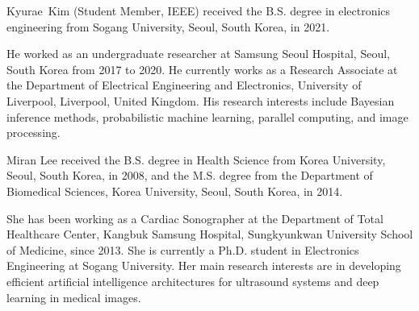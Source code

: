 
\begin{IEEEbiography}{Kyurae~Kim} (Student Member, IEEE) received the B.S. degree in electronics engineering from Sogang University, Seoul, South Korea, in 2021.

  He worked as an undergraduate researcher at Samsung Seoul Hospital, Seoul, South Korea from 2017 to 2020.
  He currently works as a Research Associate at the Department of Electrical Engineering and Electronics, University of Liverpool, Liverpool, United Kingdom.
  His research interests include Bayesian inference methods, probabilistic machine learning, parallel computing, and image processing.
\end{IEEEbiography}

\begin{IEEEbiography}{Miran Lee} received the B.S. degree in Health Science from Korea University, Seoul, South Korea, in 2008, and the M.S. degree from the Department of Biomedical Sciences, Korea University, Seoul, South Korea, in 2014.

  She has been working as a Cardiac Sonographer at the Department of Total Healthcare Center, Kangbuk Samsung Hospital, Sungkyunkwan University School of Medicine, since 2013.
  She is currently a Ph.D. student in Electronics Engineering at Sogang University. 
  Her main research interests are in developing efficient artificial intelligence architectures for ultrasound systems and deep learning in medical images.
\end{IEEEbiography}

